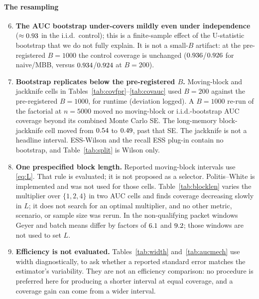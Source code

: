 \documentclass[a4paper,fleqn]{cas-dc}
\begin{document}
\paragraph{The resampling}
\begin{enumerate}\setcounter{enumi}{5}
\item \textbf{The AUC bootstrap under-covers mildly even under independence} ($\approx 0.93$ in
  the i.i.d.\ control); this is a finite-sample effect of the U-statistic bootstrap that we do not
  fully explain. It is not a small-$B$ artifact: at the pre-registered $B{=}1000$ the control
  coverage is unchanged ($0.936$/$0.926$ for naive/MBB, versus
  $0.934$/$0.924$ at $B{=}200$).
\item \textbf{Bootstrap replicates below the pre-registered $B$.} Moving-block and jackknife cells
  in Tables~\ref{tab:covfpr}--\ref{tab:covauc} used $B{=}200$ against the pre-registered $B{=}1000$,
  for runtime (deviation logged). A $B{=}1000$ re-run of the factorial at $n{=}5000$ moved no
  moving-block or i.i.d.-bootstrap AUC coverage beyond its combined Monte Carlo SE. The long-memory
  block-jackknife cell moved from $0.54$ to $0.49$, past that SE. The jackknife is
  not a headline interval. ESS-Wilson and the recall ESS plug-in contain no bootstrap, and
  Table~\ref{tab:split} is Wilson only.
\item \textbf{One prespecified block length.} Reported moving-block intervals use \eqref{eq:L}.
  That rule is evaluated; it is not proposed as a selector. Politis--White is implemented and was
  not used for those cells. Table~\ref{tab:blocklen} varies the multiplier over $\{1,2,4\}$ in two
  AUC cells and finds coverage decreasing slowly in $L$; it does not search for an optimal
  multiplier, and no other metric, scenario, or sample size was rerun. In the non-qualifying packet
  windows Geyer and batch means differ by factors of $6.1$ and $9.2$; those
  windows are not used to set $L$.
\item \textbf{Efficiency is not evaluated.} Tables~\ref{tab:width} and~\ref{tab:aucmech} use width
  diagnostically, to ask whether a reported standard error matches the estimator's variability.
  They are not an efficiency comparison: no procedure is preferred here for producing a shorter
  interval at equal coverage, and a coverage gain can come from a wider interval.
\end{enumerate}
\end{document}
